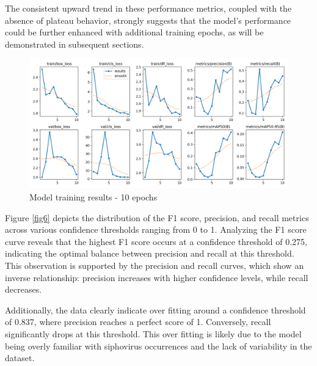 \documentclass[runningheads]{llncs}
\begin{document}
The consistent upward trend in these performance metrics, coupled with the absence of plateau behavior, strongly suggests that the model's performance could be further enhanced with additional training epochs, as will be demonstrated in subsequent sections.

\begin{figure}[H]
\begin{center}
\includegraphics[width=.8\textwidth]{./figures/fig5_10e_results.png}
\caption{Model training results - 10 epochs} \label{fig5}
\end{center}
\end{figure}

Figure \ref{fig6} depicts the distribution of the F1 score, precision, and recall metrics across various confidence thresholds ranging from 0 to 1. Analyzing the F1 score curve reveals that the highest F1 score occurs at a confidence threshold of 0.275, indicating the optimal balance between precision and recall at this threshold. This observation is supported by the precision and recall curves, which show an inverse relationship: precision increases with higher confidence levels, while recall decreases.

Additionally, the data clearly indicate over fitting around a confidence threshold of 0.837, where precision reaches a perfect score of 1. Conversely, recall significantly drops at this threshold. This over fitting is likely due to the model being overly familiar with siphovirus occurrences and the lack of variability in the dataset.
\end{document}
